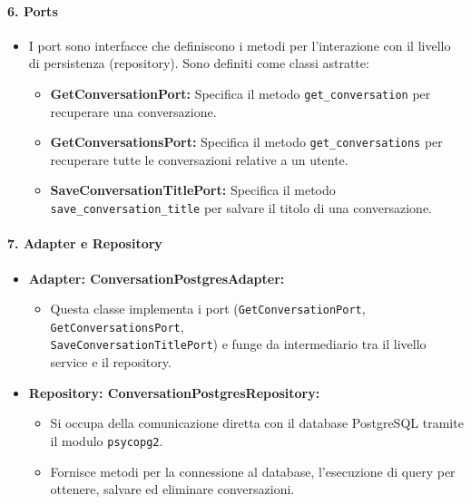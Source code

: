     \paragraph{6. Ports}
    \begin{itemize}
        \item I port sono interfacce che definiscono i metodi per l'interazione con il livello di persistenza (repository). Sono definiti come classi astratte:
        \begin{itemize}
            \item \textbf{GetConversationPort:} Specifica il metodo \texttt{get\_conversation} per recuperare una conversazione.
            \item \textbf{GetConversationsPort:} Specifica il metodo \texttt{get\_conversations} per recuperare tutte le conversazioni relative a un utente.
            \item \textbf{SaveConversationTitlePort:} Specifica il metodo \texttt{save\_conversation\_title} per salvare il titolo di una conversazione.
        \end{itemize}
    \end{itemize}

    \paragraph{7. Adapter e Repository}
    \begin{itemize}
        \item \textbf{Adapter: ConversationPostgresAdapter:}
        \begin{itemize}
            \item Questa classe implementa i port (\texttt{GetConversationPort}, \texttt{GetConversationsPort}, \\ 
            \texttt{SaveConversationTitlePort}) e funge da intermediario tra il livello service e il repository.
        \end{itemize}
        \item \textbf{Repository: ConversationPostgresRepository:}
        \begin{itemize}
            \item Si occupa della comunicazione diretta con il database PostgreSQL tramite il modulo \texttt{psycopg2}.
            \item Fornisce metodi per la connessione al database, l'esecuzione di query per ottenere, salvare ed eliminare conversazioni.
        \end{itemize}
    \end{itemize}

